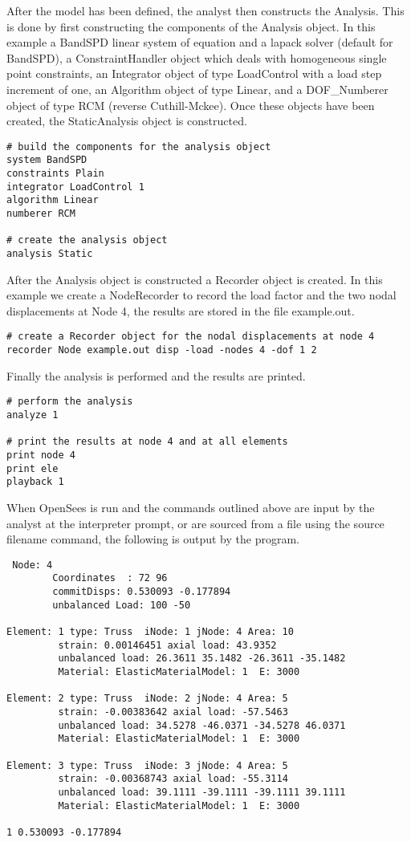 \documentclass[12pt]{article}
\begin{document}
After the model has been defined, the analyst then constructs the
Analysis. This is done by
first constructing the components of the Analysis object. In this
example a BandSPD linear system of equation and a lapack solver
(default for BandSPD), a ConstraintHandler object which deals with
homogeneous single point constraints, an Integrator object of type
LoadControl with a load step increment of one, an Algorithm object of
type Linear, and a DOF\_Numberer object of type RCM (reverse
Cuthill-Mckee). Once these objects have been created, the StaticAnalysis
object is constructed. 

{\sf\small \begin{verbatim}
# build the components for the analysis object
system BandSPD
constraints Plain
integrator LoadControl 1
algorithm Linear
numberer RCM

# create the analysis object 
analysis Static 
\end{verbatim} }

After the Analysis object is constructed a Recorder object is
created. In this example we create a NodeRecorder to record the
load factor and the two nodal displacements at Node 4, the results are
stored in the file {\sf example.out}.

{\sf\small \begin{verbatim}
# create a Recorder object for the nodal displacements at node 4
recorder Node example.out disp -load -nodes 4 -dof 1 2
\end{verbatim} }

Finally the analysis is performed and the results are printed. 

{\sf\small \begin{verbatim}
# perform the analysis
analyze 1

# print the results at node 4 and at all elements
print node 4
print ele
playback 1
\end{verbatim} }

When OpenSees is run and the commands outlined above are input by the analyst at the
interpreter prompt, or are sourced from a file using the {\sf source
filename} command, the following is output by the program. 

{\sf\small
\begin{verbatim}
 Node: 4
        Coordinates  : 72 96 
        commitDisps: 0.530093 -0.177894 
        unbalanced Load: 100 -50 

Element: 1 type: Truss  iNode: 1 jNode: 4 Area: 10 
         strain: 0.00146451 axial load: 43.9352 
         unbalanced load: 26.3611 35.1482 -26.3611 -35.1482 
         Material: ElasticMaterialModel: 1  E: 3000

Element: 2 type: Truss  iNode: 2 jNode: 4 Area: 5 
         strain: -0.00383642 axial load: -57.5463 
         unbalanced load: 34.5278 -46.0371 -34.5278 46.0371 
         Material: ElasticMaterialModel: 1  E: 3000

Element: 3 type: Truss  iNode: 3 jNode: 4 Area: 5 
         strain: -0.00368743 axial load: -55.3114 
         unbalanced load: 39.1111 -39.1111 -39.1111 39.1111 
         Material: ElasticMaterialModel: 1  E: 3000

1 0.530093 -0.177894
\end{verbatim}
}
\end{document}
